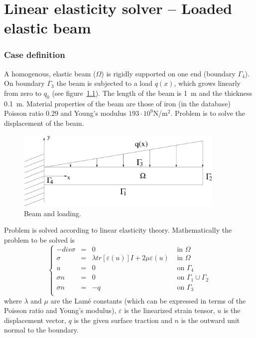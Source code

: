 \chapter{Linear elasticity solver -- Loaded elastic beam}


\subsection*{Case definition}

A homogenous, elastic beam ($\Omega$) is rigidly supported on one 
end (boundary $\Gamma_4$). On boundary $\Gamma_3$ the beam is subjected 
to a load $q(x)$, which grows linearly from zero to $q_0$ 
(see figure~\ref{fg:beam}). The length of the beam is 1~m and the thickness 0.1~m.
Material properties of the beam are those of iron (in the database) Poisson 
ratio 0.29 and Young's modulus $193\cdot 10^9$N/m$^2$. Problem is to solve the 
displacement of the beam.  

\begin{figure}[h]
\centering
\includegraphics[width=100mm]{Beam}
\caption{Beam and loading.}\label{fg:beam}
\end{figure}

Problem is solved according to linear elasticity theory. Mathematically 
the problem to be solved is
\begin{equation}
\left \{
\begin{array}{rcll}
-div \sigma & = & 0 & \mbox{ in } \Omega \\
\sigma & = & \lambda tr [\varepsilon(u)]I + 2 \mu \varepsilon(u) &
\mbox{ in } \Omega \\
u & = & 0 & \mbox{ on } \Gamma_4 \\
\sigma n & = & 0 & \mbox{ on } \Gamma_1 \cup \Gamma_2 \\
\sigma n & = & -q & \mbox{ on } \Gamma_3 \\
\end{array}
\right .
\end{equation}
where $\lambda$ and $\mu$ are the Lam\'{e} constants (which can be expressed 
in terms of the Poisson ratio and Young's modulus), $\varepsilon$ is the 
linearized strain tensor, $u$ is the displacement vector, $q$ is the given
surface traction and $n$ is the outward unit normal to the boundary.



